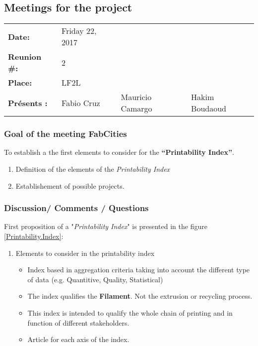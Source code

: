 \subsection{Meetings for the project}

\begin{flushleft}
	\begin{tabular}{l l l l}
		
		{\Large \textbf{Date:}}	& Friday 22, 2017 & &\\
		{\Large \textbf{Reunion \#: }} & 2 & & \\ 
		{\Large \textbf{Place: }} & LF2L & &\\ %
		{\Large \textbf{Présents : }}	& \tabitem Fabio Cruz & \tabitem Mauricio Camargo & \tabitem Hakim Boudaoud\\		
	\end{tabular}
\end{flushleft}


\subsubsection*{Goal of the meeting FabCities} 
To establish a the first elements to consider for the \textbf{``Printability Index''}.
\begin{enumerate}[noitemsep]
	\item Definition of the elements of the \textit{Printability Index}
	\item Establishement of possible projects.
\end{enumerate}


\subsubsection*{Discussion/ Comments / Questions} 

First proposition of a "\textit{Printability Index}" is presented in the figure \ref{Printability.Index}:


\begin{enumerate}[noitemsep]
	\item Elements to consider in the printability index
	\begin{itemize}
		\item Index based in aggregation criteria taking into account the different type of data (e.g. Quantitive, Quality, Statistical)
		\item The index qualifies the \textbf{Filament}. Not the extrusion or recycling process.
		\item This index is intended to qualify the whole chain of printing and in function of different stakeholders.
		\item Article for each axis of the index.
		
	\end{itemize}
\end{enumerate}


